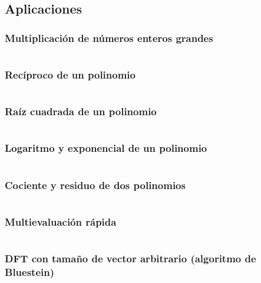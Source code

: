\documentclass[11pt]{article}
\begin{document}
		\subsection{Aplicaciones}
			\subsubsection{Multiplicación de números enteros grandes}
			\inputminted[tabsize=2,breaklines,firstline=112,lastline=145,fontsize=\small]{c++}{fft.cpp}
			
			\subsubsection{Recíproco de un polinomio}
			\inputminted[tabsize=2,breaklines,firstline=147,lastline=168,fontsize=\small]{c++}{fft.cpp}
			
			\subsubsection{Raíz cuadrada de un polinomio}
			\inputminted[tabsize=2,breaklines,firstline=173,lastline=194,fontsize=\small]{c++}{fft.cpp}
			
			\subsubsection{Logaritmo y exponencial de un polinomio}
			\inputminted[tabsize=2,breaklines,firstline=197,lastline=239,fontsize=\small]{c++}{fft.cpp}
			
			\subsubsection{Cociente y residuo de dos polinomios}
			\inputminted[tabsize=2,breaklines,firstline=241,lastline=266,fontsize=\small]{c++}{fft.cpp}
			
			\subsubsection{Multievaluación rápida}
			\inputminted[tabsize=2,breaklines,firstline=268,lastline=312,fontsize=\small]{c++}{fft.cpp}
			
			\subsubsection{DFT con tamaño de vector arbitrario (algoritmo de Bluestein)}
			\inputminted[tabsize=2,breaklines,firstline=314,lastline=334,fontsize=\small]{c++}{fft.cpp}
			
\end{document}
